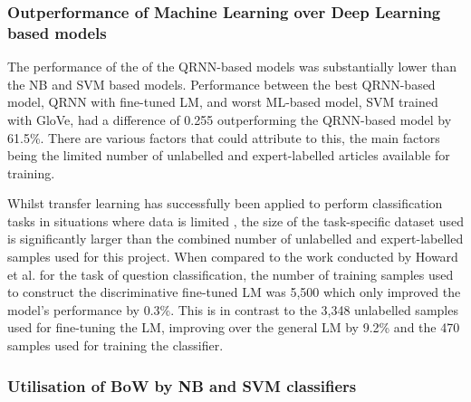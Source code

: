 \documentclass[a4paper,twoside,phd]{BYUPhys}
\begin{document}
\subsubsection{Outperformance of Machine Learning over Deep Learning based models}

The performance of the of the QRNN-based models was substantially lower than the NB and SVM based models. Performance between the best QRNN-based model, QRNN with fine-tuned LM, and worst ML-based model, SVM trained with GloVe, had a difference of 0.255 outperforming the QRNN-based model by 61.5\%. There are various factors that could attribute to this, the main factors being the limited number of unlabelled and expert-labelled articles available for training. \newline

Whilst transfer learning has successfully been applied to perform classification tasks in situations where data is limited \cite{Glorot2011} \cite{Radford2018}, the size of the task-specific dataset used is significantly larger than the combined number of unlabelled and expert-labelled samples used for this project. When compared to the work conducted by Howard et al. \cite{Howard2018} for the task of question classification, the number of training samples used to construct the discriminative fine-tuned LM was 5,500 which only improved the model's performance by 0.3\%. This is in contrast to the 3,348 unlabelled samples used for fine-tuning the LM, improving over the general LM by 9.2\% and the 470 samples used for training the classifier. \newline

\subsubsection{Utilisation of BoW by NB and SVM classifiers}
\end{document}
